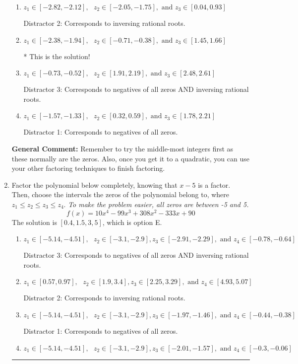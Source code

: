 \documentclass{extbook}[14pt]
\newcommand{\litem}[1]{\item #1

\rule{\textwidth}{0.4pt}}
\begin{document}
\begin{enumerate}
{\begin{enumerate}[label=\Alph*.]
 Distractor 4: Corresponds to moving factors from one rational to another.
\item \( z_1 \in [-2.82, -2.12], \text{   }  z_2 \in [-2.05, -1.75], \text{   and   } z_3 \in [0.04, 0.93] \)

 Distractor 2: Corresponds to inversing rational roots.
\item \( z_1 \in [-2.38, -1.94], \text{   }  z_2 \in [-0.71, -0.38], \text{   and   } z_3 \in [1.45, 1.66] \)

* This is the solution!
\item \( z_1 \in [-0.73, -0.52], \text{   }  z_2 \in [1.91, 2.19], \text{   and   } z_3 \in [2.48, 2.61] \)

 Distractor 3: Corresponds to negatives of all zeros AND inversing rational roots.
\item \( z_1 \in [-1.57, -1.33], \text{   }  z_2 \in [0.32, 0.59], \text{   and   } z_3 \in [1.78, 2.21] \)

 Distractor 1: Corresponds to negatives of all zeros.
\end{enumerate}

\textbf{General Comment:} Remember to try the middle-most integers first as these normally are the zeros. Also, once you get it to a quadratic, you can use your other factoring techniques to finish factoring.
}
\litem{
Factor the polynomial below completely, knowing that $x -5$ is a factor. Then, choose the intervals the zeros of the polynomial belong to, where $z_1 \leq z_2 \leq z_3 \leq z_4$. \textit{To make the problem easier, all zeros are between -5 and 5.}
\[ f(x) = 10x^{4} -99 x^{3} +308 x^{2} -333 x + 90 \]The solution is \( [0.4, 1.5, 3, 5] \), which is option E.\begin{enumerate}[label=\Alph*.]
\item \( z_1 \in [-5.14, -4.51], \text{   }  z_2 \in [-3.1, -2.9], z_3 \in [-2.91, -2.29], \text{   and   } z_4 \in [-0.78, -0.64] \)

 Distractor 3: Corresponds to negatives of all zeros AND inversing rational roots.
\item \( z_1 \in [0.57, 0.97], \text{   }  z_2 \in [1.9, 3.4], z_3 \in [2.25, 3.29], \text{   and   } z_4 \in [4.93, 5.07] \)

 Distractor 2: Corresponds to inversing rational roots.
\item \( z_1 \in [-5.14, -4.51], \text{   }  z_2 \in [-3.1, -2.9], z_3 \in [-1.97, -1.46], \text{   and   } z_4 \in [-0.44, -0.38] \)

 Distractor 1: Corresponds to negatives of all zeros.
\item \( z_1 \in [-5.14, -4.51], \text{   }  z_2 \in [-3.1, -2.9], z_3 \in [-2.01, -1.57], \text{   and   } z_4 \in [-0.3, -0.06] \)


\end{enumerate}}
\end{enumerate}
\end{document}

